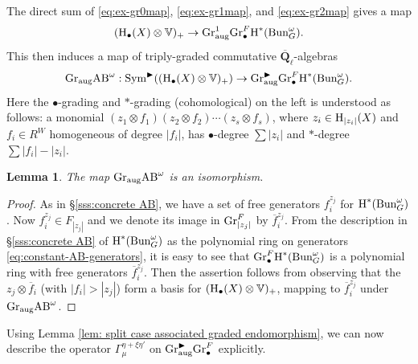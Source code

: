 \documentclass[reqno]{amsart}
\numberwithin{equation}{subsection}
\newtheorem{lemma}[subsubsection]{Lemma}
\theoremstyle{definition}
\def\VV{\mathbb{V}}
\newcommand{\Bun}{\textup{Bun}}
\newcommand{\Gr}{\textup{Gr}}
\newcommand\Sym{\textup{Sym}}
\newcommand{\Qlbar}{\overline{\Q}_\ell}
\newcommand{\bu}{\bullet}
\newcommand{\ov}{\overline}
\newcommand\ot{\otimes}
\newcommand{\homog}[2]{\textup{H}_{#1}({#2})}  %
\newcommand{\cohog}[2]{\textup{H}^{#1}({#2})}     %
\newcommand\G\Gamma
\newcommand{\y}{\eta}
\newcommand{\om}{\omega}
\newcommand\aug{\textup{aug}}
\newcommand\AB{\textup{AB}}
\newcommand\bl{\blacktriangleright}
\newcommand{\Q}{\mathbf{Q}}
\begin{document}
The direct sum of \eqref{eq:ex-gr0map}, \eqref{eq:ex-gr1map}, and \eqref{eq:ex-gr2map} gives a map
\begin{equation*}
(\homog{\bu}{X}\ot \VV)_{+}\to \Gr^{1}_{\aug}\Gr^{F}_{\bu}\cohog{*}{\Bun^{\om}_{G}}.
\end{equation*}
This then induces a map of triply-graded commutative $\Qlbar$-algebras
\begin{equation*}
\Gr_{\aug}\AB^{\om}: \Sym^{\bl}((\homog{\bu}{X}\ot \VV)_{+})\to \Gr^{\bl}_{\aug}\Gr^{F}_{\bu}\cohog{*}{\Bun^{\om}_{G}}.
\end{equation*}
Here the $\bu$-grading and $*$-grading (cohomological) on the left is understood as follows: a monomial $(z_{1}\ot f_{1})(z_{2}\ot f_{2})\cdots (z_{s}\ot f_{s})$, where $z_{i}\in \homog{
|z_{i}|}{X}$ and $f_{i}\in R^{W}$ homogeneous of degree $|f_{i}|$, has $\bu$-degree $\sum|z_{i}|$ and $*$-degree $\sum|f_{i}|-|z_{i}|$.


\begin{lemma}
The map $\Gr_{\aug}\AB^{\om}$ is an isomorphism.
\end{lemma}
\begin{proof} As in \S\ref{sss:concrete AB}, we have a set of free generators $f_{i}^{z_{j}}$ for $\cohog{*}{\Bun^{\om}_{G}}$. Now $f_{i}^{z_{j}}\in F_{|z_{j}|}$ and we denote its image in $\Gr^{F}_{|z_{j}|}$ by $\ov f_{i}^{z_{j}}$. From the description in \S\ref{sss:concrete AB} of $\cohog{*}{\Bun^{\om}_{G}}$ as the polynomial ring on generators \eqref{eq:constant-AB-generators}, it is easy to see that $\Gr^{F}_{\bu}\cohog{*}{\Bun^{\om}_{G}}$ is a polynomial ring with free generators $\ov f_{i}^{z_{j}}$. Then the assertion follows from observing that the $z_j \otimes \ov f_{i}$ (with $|f_{i}|>|z_{j}|$) form a basis for $(\homog{\bu}{X}\ot \VV)_{+}$, mapping to $\ov f_{i}^{z_{j}}$ under $\Gr_{\aug}\AB^\omega$.  
\end{proof}


Using Lemma \ref{lem: split case associated graded endomorphism}, we can now describe the operator $\G_{\mu}^{\y + \xi \y'}$ on $\Gr^{\bl}_{\aug}\Gr^{F}_{\bu}$ explicitly. 
\end{document}
